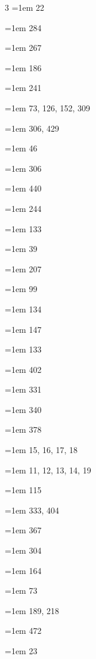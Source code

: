 \begin{multicols}{3}
\hangindent=1em  22\par
\hangindent=1em  284\par
\hangindent=1em  267\par
\hangindent=1em  186\par
\hangindent=1em  241\par
\hangindent=1em  73, 126, 152, 309\par
\hangindent=1em  306, 429\par
\hangindent=1em  46\par
\hangindent=1em  306\par
\hangindent=1em  440\par
\hangindent=1em  244\par
\hangindent=1em  133\par
\hangindent=1em  39\par
\hangindent=1em  207\par
\hangindent=1em  99\par
\hangindent=1em  134\par
\hangindent=1em  147\par
\hangindent=1em  133\par
\hangindent=1em  402\par
\hangindent=1em  331\par
\hangindent=1em  340\par
\hangindent=1em  378\par
\hangindent=1em  15, 16, 17, 18\par
\hangindent=1em  11, 12, 13, 14, 19\par
\hangindent=1em  115\par
\hangindent=1em  333, 404\par
\hangindent=1em  367\par
\hangindent=1em  304\par
\hangindent=1em  164\par
\hangindent=1em  73\par
\hangindent=1em  189, 218\par
\hangindent=1em  472\par
\hangindent=1em  23\par

\end{multicols}
